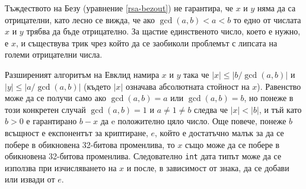   Тъждеството на Безу (уравнение \ref{rsa-bezout}) не гарантира, че $x$ и $y$ няма да са отрицателни, като лесно се вижда, че ако $\gcd(a,b) < a < b$ то едно от числата $x$ и $y$ трябва да бъде отрицателно. За щастие единственото число, което е нужно, е $x$, и съществува трик чрез който да се заобиколи проблемът с липсата на големи отрицателни числа.

  Разширеният алгоритъм на Евклид намира $x$ и $y$ така че $|x|\leq|b/\gcd(a,b)|$ и $|y|\leq|a/\gcd(a,b)|$ (където $|x|$ означава абсолютната стойност на $x$). Равенство може да се получи само ако $\gcd(a,b)=a$ или $\gcd(a,b)=b$, но понеже в този конкретен случай $\gcd(a,b)=1$ и $a \neq 1 \neq b$ следва че $|x|<|b|$, и тъй като $b>0$ е гарантирано $b-x$ да e положително цяло число.
  Още повече, понеже $b$ всъщност е експонентът за криптиране, $e$, който е достатъчно малък за да се побере в обикновена 32-битова променлива, то $x$ също може да се побере в обикновена 32-битова променлива. Следователно {\tt int} дата типът може да се използва при изчисляването на $x$ и после, в зависимост от знака, да се добави или извади от $e$.

